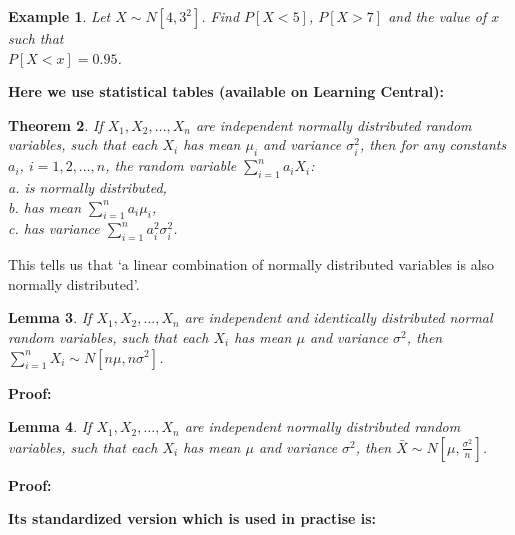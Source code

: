 \documentclass[12pt]{article}
\newtheorem{theorem}{Theorem}[section]
\newtheorem{lemma}[theorem]{Lemma}
\newtheorem{example}[theorem]{Example}
\begin{document}
\begin{example}
Let $X \sim N[4,3^2]$. Find $P[X<5]$, $P[X>7]$ and the value of $x$ such that\\ $P[X<x]=0.95$.
\end{example}
\begin{mdframed}
{\bf Here we use statistical tables (available on Learning Central):}
\textcolor[rgb]{1.00,1.00,1.00}{\lipsum[1-2]}
\end{mdframed}
\begin{theorem}
If $X_{1},X_{2},\ldots,X_{n}$ are independent normally distributed random variables, such that each $X_{i}$ has mean $\mu_{i}$ and variance $\sigma_{i}^{2}$, then for any constants $a_{i}$, $i=1,2,\ldots,n$, the random variable $\displaystyle \sum_{i=1}^{n}a_{i}X_{i}$:\\
a. is normally distributed,\\
b. has mean $\displaystyle \sum_{i=1}^{n}a_{i}\mu_{i}$,\\
c. has variance $\displaystyle \sum_{i=1}^{n}a_{i}^{2}\sigma_{i}^{2}$.
\end{theorem}
This tells us that `a linear combination of normally distributed variables is also normally distributed'.

\begin{lemma}
If $X_{1},X_{2},\ldots,X_{n}$ are independent and identically distributed normal random variables, such that each $X_{i}$ has mean $\mu$ and variance $\sigma^{2}$, then $\displaystyle \sum_{i=1}^{n}X_{i} \sim N\left[n\mu, n\sigma^2\right]$.
\end{lemma}

\begin{mdframed}
{\bf Proof:}
\textcolor[rgb]{1.00,1.00,1.00}{\lipsum[1]}
\end{mdframed}

\begin{lemma}
If $X_{1},X_{2},\ldots,X_{n}$ are independent normally distributed random variables, such that each $X_{i}$ has mean $\mu$ and variance $\sigma^{2}$, then $\displaystyle \bar{X} \sim N\left[\mu, \frac{\sigma^{2}}{n}\right]$.
\end{lemma}

\begin{mdframed}
{\bf Proof:}
\textcolor[rgb]{1.00,1.00,1.00}{\lipsum[1]}
\end{mdframed}

\begin{mdframed}
{\bf Its standardized version which is used in practise is:}
\textcolor[rgb]{1.00,1.00,1.00}{\lipsum[1-2]}
\end{mdframed}
\end{document}
